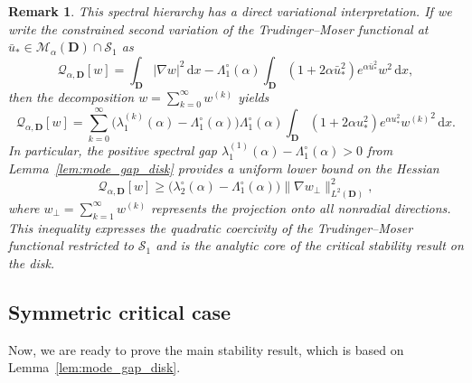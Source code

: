 \documentclass[reqno,11pt]{amsart}
\newtheorem{remark}[theorem]{Remark}
\theoremstyle{definition}
\newcommand{\ud}{\,\mathrm{d}}
\begin{document}
\begin{remark}
This spectral hierarchy has a direct variational interpretation.
If we write the constrained second variation of the Trudinger--Moser functional at
$\bar{u}_*\in\mathcal{M}_\alpha(\mathbf{D})\cap\mathcal{S}_1$ as
\[
\mathscr{Q}_{\alpha,\mathbf{D}}[w]
=\int_{\mathbf{D}}|\nabla w|^2\ud x
-\Lambda_1^\circ(\alpha)\int_{\mathbf{D}}(1+2\alpha \bar{u}_*^2)e^{\alpha \bar{u}_*^2}w^2\ud x,
\]
then the decomposition $w=\sum_{k=0}^\infty w^{(k)}$ yields
\[
\mathscr{Q}_{\alpha,\mathbf{D}}[w]
=\sum_{k=0}^\infty
\big(\lambda_1^{(k)}(\alpha)-\Lambda_1^\circ(\alpha)\big)
\Lambda_1^\circ(\alpha)\int_{\mathbf{D}}(1+2\alpha u_*^2)e^{\alpha u_*^2}{w^{(k)}}^2\ud x.
\]
In particular, the positive spectral gap
$\lambda_1^{(1)}(\alpha)-\Lambda_1^\circ(\alpha)>0$
from Lemma~\ref{lem:mode_gap_disk}
provides a uniform lower bound on the Hessian 
\[
\mathscr{Q}_{\alpha,\mathbf{D}}[w] \ge
\big(\lambda_2^\circ(\alpha)-\Lambda_1^\circ(\alpha)\big)
\|\nabla w_\perp\|_{L^2(\mathbf{D})}^2,
\]
where $w_\perp=\sum_{k=1}^\infty w^{(k)}$ represents the projection onto all nonradial directions.
This inequality expresses the quadratic coercivity of the Trudinger--Moser functional
restricted to $\mathcal{S}_1$ and is the analytic core of the critical stability
result on the disk.
\end{remark}



\subsection{Symmetric critical case}\label{subsec:critical_case}
Now, we are ready to prove the main stability result, which is based on Lemma~\ref{lem:mode_gap_disk}.
\end{document}
